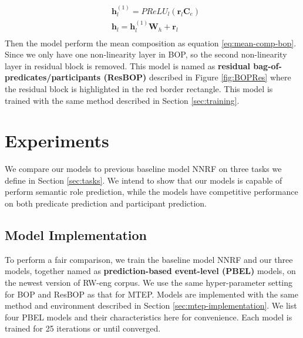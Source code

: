 \documentclass[a4paper]{article}
\begin{document}
\begin{equation} \label{eq:hidden-bopres}
\begin{aligned}
    & \mathbf{h}_l^{(1)}
        = PReLU_l(\mathbf{r}_l \mathbf{C}_e) \\
    & \mathbf{h}_{l}
        = \mathbf{h}_{l}^{(1)}\mathbf{W}_h + \mathbf{r}_l \\
\end{aligned}
\end{equation}
Then the model perform the mean composition as  equation \eqref{eq:mean-comp-bop}. Since we only have one non-linearity layer in BOP, so the second non-linearity layer in residual block is removed. This model is named as \textbf{residual bag-of-predicates/participants (ResBOP)} described in Figure \ref{fig:BOPRes} where the residual block is highlighted in the red border rectangle. This model is trained with the same method described in Section  \ref{sec:training}. 



 
\section{Experiments}  \label{sec:exp}
We compare our models to previous baseline model NNRF on three tasks we define in Section \ref{sec:tasks}. We intend to show that our models is capable of perform semantic role prediction, while the models have competitive performance on both predicate prediction and participant prediction. 


\subsection{Model Implementation} \label{sec:implementation}
To perform a fair comparison, we train the baseline model NNRF and our three models, together named as \textbf{prediction-based event-level (PBEL)} models, on the newest version of RW-eng corpus. We use the same hyper-parameter setting for BOP and ResBOP as that for MTEP. Models are implemented with the same method and environment described in Section \ref{sec:mtep-implementation}. We list four PBEL models and their characteristics here for convenience. Each model is trained for 25 iterations or until converged. 
\end{document}
